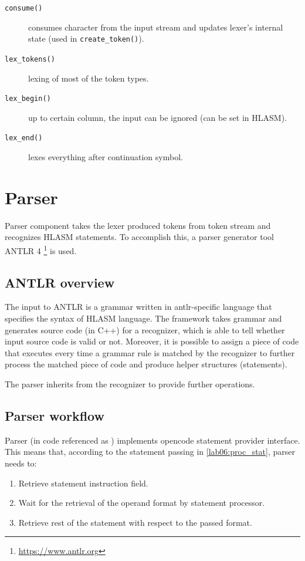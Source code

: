 \begin{description}
\begin{description}
			\item[\texttt{consume()}] consumes character from the input stream and updates lexer's internal state (used in \texttt{create\_token()}).
			
			\item[\texttt{lex\_tokens()}] lexing of most of the token types.
			
			\item[\texttt{lex\_begin()}] up to certain column, the input can be ignored (can be set in HLASM).
			
			\item[\texttt{lex\_end()}] lexes everything after continuation symbol.
			
			
		\end{description}
		
\end{description}


\section{Parser}

Parser component takes the lexer produced tokens from token stream and recognizes HLASM statements. To accomplish this, a parser generator tool ANTLR 4 \footnote{\url{https://www.antlr.org}} is used.

\subsection{ANTLR overview}

The input to ANTLR is a grammar written in antlr-specific language that specifies the syntax of HLASM language. The framework takes grammar and generates source code (in C++) for a recognizer, which is able to tell whether input source code is valid or not. Moreover, it is possible to assign a piece of code that executes every time a grammar rule is matched by the recognizer to further process the matched piece of code and produce helper structures (statements).

The parser inherits from the recognizer to provide further operations.

\subsection{Parser workflow}

Parser (in code referenced as ) implements opencode statement provider interface. This means that, according to the statement passing in \cref{lab06:proc_stat}, parser needs to:
\begin{enumerate}
	\item Retrieve statement instruction field.
	\item Wait for the retrieval of the operand format by statement processor.
	\item Retrieve rest of the statement with respect to the passed format.
\end{enumerate} 

